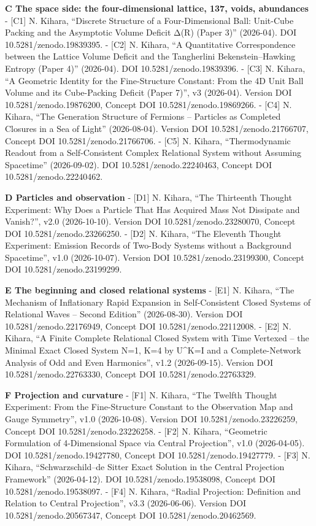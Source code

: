 \documentclass[
  a4paper,
]{article}
\begin{document}
\textbf{C The space side: the four-dimensional lattice, 137, voids,
abundances} - {[}C1{]} N. Kihara, ``Discrete Structure of a
Four-Dimensional Ball: Unit-Cube Packing and the Asymptotic Volume
Deficit Δ(R) (Paper 3)'' (2026-04). DOI 10.5281/zenodo.19839395. -
{[}C2{]} N. Kihara, ``A Quantitative Correspondence between the Lattice
Volume Deficit and the Tangherlini Bekenstein--Hawking Entropy (Paper
4)'' (2026-04). DOI 10.5281/zenodo.19839396. - {[}C3{]} N. Kihara, ``A
Geometric Identity for the Fine-Structure Constant: From the 4D Unit
Ball Volume and its Cube-Packing Deficit (Paper 7)'', v3 (2026-04).
Version DOI 10.5281/zenodo.19876200, Concept DOI
10.5281/zenodo.19869266. - {[}C4{]} N. Kihara, ``The Generation
Structure of Fermions -- Particles as Completed Closures in a Sea of
Light'' (2026-08-04). Version DOI 10.5281/zenodo.21766707, Concept DOI
10.5281/zenodo.21766706. - {[}C5{]} N. Kihara, ``Thermodynamic Readout
from a Self-Consistent Complex Relational System without Assuming
Spacetime'' (2026-09-02). DOI 10.5281/zenodo.22240463, Concept DOI
10.5281/zenodo.22240462.

\textbf{D Particles and observation} - {[}D1{]} N. Kihara, ``The
Thirteenth Thought Experiment: Why Does a Particle That Has Acquired
Mass Not Dissipate and Vanish?'', v2.0 (2026-10-10). Version DOI
10.5281/zenodo.23280070, Concept DOI 10.5281/zenodo.23266250. - {[}D2{]}
N. Kihara, ``The Eleventh Thought Experiment: Emission Records of
Two-Body Systems without a Background Spacetime'', v1.0 (2026-10-07).
Version DOI 10.5281/zenodo.23199300, Concept DOI
10.5281/zenodo.23199299.

\textbf{E The beginning and closed relational systems} - {[}E1{]} N.
Kihara, ``The Mechanism of Inflationary Rapid Expansion in
Self-Consistent Closed Systems of Relational Waves -- Second Edition''
(2026-08-30). Version DOI 10.5281/zenodo.22176949, Concept DOI
10.5281/zenodo.22112008. - {[}E2{]} N. Kihara, ``A Finite Complete
Relational Closed System with Time Vertexed -- the Minimal Exact Closed
System N=1, K=4 by U\^{}K=I and a Complete-Network Analysis of Odd and
Even Harmonics'', v1.2 (2026-09-15). Version DOI
10.5281/zenodo.22763330, Concept DOI 10.5281/zenodo.22763329.

\textbf{F Projection and curvature} - {[}F1{]} N. Kihara, ``The Twelfth
Thought Experiment: From the Fine-Structure Constant to the Observation
Map and Gauge Symmetry'', v1.0 (2026-10-08). Version DOI
10.5281/zenodo.23226259, Concept DOI 10.5281/zenodo.23226258. - {[}F2{]}
N. Kihara, ``Geometric Formulation of 4-Dimensional Space via Central
Projection'', v1.0 (2026-04-05). DOI 10.5281/zenodo.19427780, Concept
DOI 10.5281/zenodo.19427779. - {[}F3{]} N. Kihara, ``Schwarzschild--de
Sitter Exact Solution in the Central Projection Framework''
(2026-04-12). DOI 10.5281/zenodo.19538098, Concept DOI
10.5281/zenodo.19538097. - {[}F4{]} N. Kihara, ``Radial Projection:
Definition and Relation to Central Projection'', v3.3 (2026-06-06).
Version DOI 10.5281/zenodo.20567347, Concept DOI
10.5281/zenodo.20462569.
\end{document}
